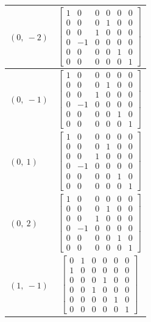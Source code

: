 \documentclass[11pt]{article}
\theoremstyle{definition}
\begin{document}
\begin{longtable}{|l|c|}
    \hline
    $\left( 0, \  -2\right)$ & ${\left[\begin{matrix}1 & 0 & 0 & 0 & 0 & 0\\0 & 0 & 0 & 1 & 0 & 0\\0 & 0 & 1 & 0 & 0 & 0\\0 & -1 & 0 & 0 & 0 & 0\\0 & 0 & 0 & 0 & 1 & 0\\0 & 0 & 0 & 0 & 0 & 1\end{matrix}\right]}$ \\
    \hline
    $\left( 0, \  -1\right)$ & ${\left[\begin{matrix}1 & 0 & 0 & 0 & 0 & 0\\0 & 0 & 0 & 1 & 0 & 0\\0 & 0 & 1 & 0 & 0 & 0\\0 & -1 & 0 & 0 & 0 & 0\\0 & 0 & 0 & 0 & 1 & 0\\0 & 0 & 0 & 0 & 0 & 1\end{matrix}\right]}$ \\
    \hline
    $\left( 0, \  1\right)$ & ${\left[\begin{matrix}1 & 0 & 0 & 0 & 0 & 0\\0 & 0 & 0 & 1 & 0 & 0\\0 & 0 & 1 & 0 & 0 & 0\\0 & -1 & 0 & 0 & 0 & 0\\0 & 0 & 0 & 0 & 1 & 0\\0 & 0 & 0 & 0 & 0 & 1\end{matrix}\right]}$ \\
    \hline
    $\left( 0, \  2\right)$ & ${\left[\begin{matrix}1 & 0 & 0 & 0 & 0 & 0\\0 & 0 & 0 & 1 & 0 & 0\\0 & 0 & 1 & 0 & 0 & 0\\0 & -1 & 0 & 0 & 0 & 0\\0 & 0 & 0 & 0 & 1 & 0\\0 & 0 & 0 & 0 & 0 & 1\end{matrix}\right]}$ \\
    \hline
    $\left( 1, \  -1\right)$ & ${\left[\begin{matrix}0 & 1 & 0 & 0 & 0 & 0\\1 & 0 & 0 & 0 & 0 & 0\\0 & 0 & 0 & 1 & 0 & 0\\0 & 0 & 1 & 0 & 0 & 0\\0 & 0 & 0 & 0 & 1 & 0\\0 & 0 & 0 & 0 & 0 & 1\end{matrix}\right]}$ \\

\end{longtable}
\end{document}
